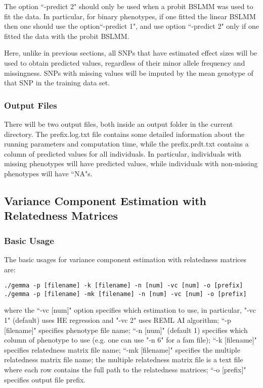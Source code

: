 \documentclass[11pt]{article}
\begin{document}
The option ``-predict 2" should only be used when a probit BSLMM was
used to fit the data. In particular, for binary phenotypes, if one
fitted the linear BSLMM then one should use the option``-predict 1",
and use option ``-predict 2" only if one fitted the data with the
probit BSLMM.

Here, unlike in previous sections, all SNPs that have estimated effect
sizes will be used to obtain predicted values, regardless of their
minor allele frequency and missingness. SNPs with missing values will
be imputed by the mean genotype of that SNP in the training data set.

\subsubsection{Output Files}

There will be two output files, both inside an output folder in the
current directory. The prefix.log.txt file contains some detailed
information about the running parameters and computation time, while
the prefix.prdt.txt contains a column of predicted values for all
individuals. In particular, individuals with missing phenotypes will
have predicted values, while individuals with non-missing phenotypes
will have ``NA"s.

\subsection{Variance Component Estimation with Relatedness Matrices}

\subsubsection{Basic Usage}

The basic usages for variance component estimation with relatedness
matrices are:

\begin{verbatim}
./gemma -p [filename] -k [filename] -n [num] -vc [num] -o [prefix]
./gemma -p [filename] -mk [filename] -n [num] -vc [num] -o [prefix]
\end{verbatim}

where the ``-vc [num]" option specifies which estimation to use, in
particular, "-vc 1" (default) uses HE regression and "-vc 2" uses REML
AI algorithm; ``-p [filename]" specifies phenotype file name; ``-n
[num]" (default 1) specifies which column of phenotype to use
(e.g. one can use "-n 6" for a fam file); ``-k [filename]" specifies
relatedness matrix file name; ``-mk [filename]" specifies the multiple
relatedness matrix file name; the multiple relatedness matrix file is
a text file where each row contains the full path to the relatedness
matrices; ``-o [prefix]" specifies output file prefix.
\end{document}
